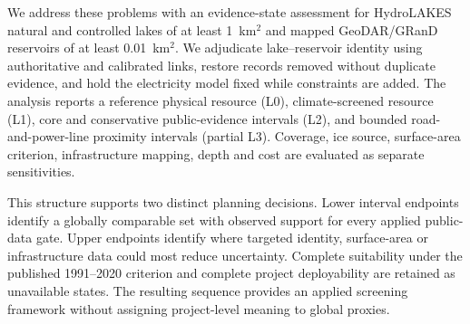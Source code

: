 We address these problems with an evidence-state assessment for HydroLAKES natural and controlled lakes of at least 1~km$^2$ and mapped GeoDAR/GRanD reservoirs of at least 0.01~km$^2$. We adjudicate lake--reservoir identity using authoritative and calibrated links, restore records removed without duplicate evidence, and hold the electricity model fixed while constraints are added. The analysis reports a reference physical resource (L0), climate-screened resource (L1), core and conservative public-evidence intervals (L2), and bounded road-and-power-line proximity intervals (partial L3). Coverage, ice source, surface-area criterion, infrastructure mapping, depth and cost are evaluated as separate sensitivities.

This structure supports two distinct planning decisions. Lower interval endpoints identify a globally comparable set with observed support for every applied public-data gate. Upper endpoints identify where targeted identity, surface-area or infrastructure data could most reduce uncertainty. Complete suitability under the published 1991--2020 criterion and complete project deployability are retained as unavailable states. The resulting sequence provides an applied screening framework without assigning project-level meaning to global proxies.

